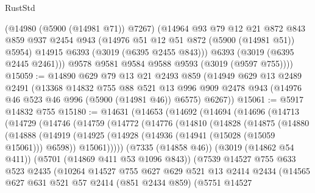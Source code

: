 \begin{lexlean}{RustStd}
\begin{coremodule}
          (@14980 (@5900 (@14981 @71)) @7267)
          (@14964
            @93
            @79
            @12
            @21
            @872
            @843
            @859
            @937
            @2454
            @943
            (@14976 @51 @12 @51 @872 (@5900 (@14981 @51)) @5954)
            @14915
            @6393
            (@3019 (@6395 @2455 @843)))
          @6393
          (@3019 (@6395 @2445 @2461)))
        @9578
        @9581
        @9584
        @9588
        @9593
        (@3019 (@9597 @755))))
@15059 := @14890
    @629
    @79
    @13
    @21
    @2493
    @859
    (@14949
      @629
      @13
      @2489
      @2491
      (@13368
        @14832
        @755
        @88
        @521
        @13
        @996
        @909
        @2478
        @943
        (@14976 @46 @523 @46 @996 (@5900 (@14981 @46)) @6575)
        @6267))
@15061 := @5917 @14832 @755
@15180 := @14631
    (@14653
      (@14692
        (@14694
          (@14696
            (@14713
              (@14729
                (@14746
                  (@14759
                    (@14772
                      (@14776
                        (@14810
                          (@14828
                            (@14875
                              (@14880
                                (@14888
                                  (@14919
                                    (@14925
                                      (@14928 (@14936 (@14941 (@15028 (@15059 @15061))) @6598))
                                      @15061)))))
                            (@7335 (@14858 @46))
                            (@3019 (@14862 @54 @411))
                            (@5701 (@14869 @411 @53 @1096 @843))
                            (@7539
                              @14527
                              @755
                              @633
                              @523
                              @2435
                              (@10264
                                @14527
                                @755
                                @627
                                @629
                                @521
                                @13
                                @2414
                                @2434
                                (@14565
                                  @627
                                  @631
                                  @521
                                  @57
                                  @2414
                                  (@851 @2434 @859)
                                  (@5751
                                    @14527

\end{coremodule}
\end{lexlean}
